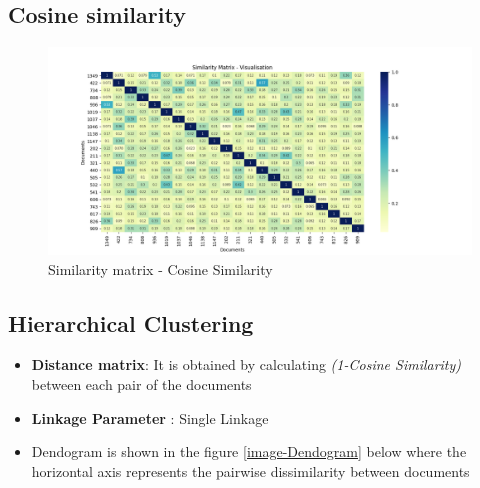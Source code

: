 \documentclass[7pt,a4paper]{article}
\begin{document}
\subsection{Cosine similarity}
\begin{figure}[h]
\centering
\includegraphics[scale=.40]{similarity1b}
\caption{Similarity matrix - Cosine Similarity}
\label{image-J-C}
\end{figure}


\subsection{Hierarchical Clustering}
\begin{itemize}
\item{\textbf{Distance matrix}: It is obtained by calculating \textit{(1-Cosine Similarity)} between each pair of the documents}
\item{\textbf{Linkage Parameter} : Single Linkage}
\item{Dendogram is shown in the figure \ref{image-Dendogram} below where the horizontal axis represents the pairwise dissimilarity between documents}
\end{itemize}
\end{document}
